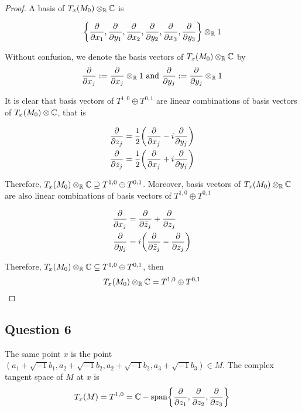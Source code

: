\documentclass{article}
\begin{document}
\begin{proof}
A basis of $T_x(M_0) \otimes_\R \C$ is

$$
    \set*{\frac{\partial}{\partial x_1}, \frac{\partial}{\partial y_1}, \frac{\partial}{\partial x_2}, \frac{\partial}{\partial y_2}, \frac{\partial}{\partial x_3}, \frac{\partial}{\partial y_3}} \otimes_\R 1
$$

Without confusion, we denote the basis vectors of $T_x(M_0) \otimes_\R \C$ by
$$
    \frac{\partial}{\partial x_j} := \frac{\partial}{\partial x_j} \otimes_\R 1 \text{ and } \frac{\partial}{\partial y_j} := \frac{\partial}{\partial y_j} \otimes_\R 1
$$

It is clear that basis vectors of $T^{1,0} \oplus T^{0,1}$ are linear combinations of basis vectors of $T_x(M_0) \otimes \C$, that is

\begin{align*}
    \frac{\partial}{\partial z_j} &= \frac{1}{2} \tuple*{\frac{\partial}{\partial x_j} - i \frac{\partial}{\partial y_j}} \\
    \frac{\partial}{\partial \bar{z}_j} &= \frac{1}{2} \tuple*{\frac{\partial}{\partial x_j} + i \frac{\partial}{\partial y_j}}
\end{align*}

Therefore, $T_x(M_0) \otimes_\R \C \supseteq T^{1,0} \oplus T^{0,1}$. Moreover, basis vectors of $T_x(M_0) \otimes_\R \C$ are also linear combinations of basis vectors of $T^{1,0} \oplus T^{0,1}$

\begin{align*}
    \frac{\partial}{\partial x_j} &= \frac{\partial}{\partial \bar{z}_j} +  \frac{\partial}{\partial z_j} \\
    \frac{\partial}{\partial y_j} &= i \tuple*{\frac{\partial}{\partial \bar{z}_j} -  \frac{\partial}{\partial z_j}}
\end{align*}



Therefore, $T_x(M_0) \otimes_\R \C \subseteq T^{1,0} \oplus T^{0,1}$, then
$$
    T_x(M_0) \otimes_\R \C = T^{1,0} \oplus T^{0,1}
$$
\end{proof}

\subsection{Question 6}

The same point $x$ is the point $(a_1 + \sqrt{-1}b_1, a_2 + \sqrt{-1}b_2, a_2 + \sqrt{-1}b_2, a_3 + \sqrt{-1}b_3) \in M$. The complex tangent space of $M$ at $x$ is
$$
    T_x(M) = T^{1, 0} = \C-\Span \set*{\frac{\partial}{\partial z_1}, \frac{\partial}{\partial z_2}, \frac{\partial}{\partial z_3}}
$$
\end{document}
